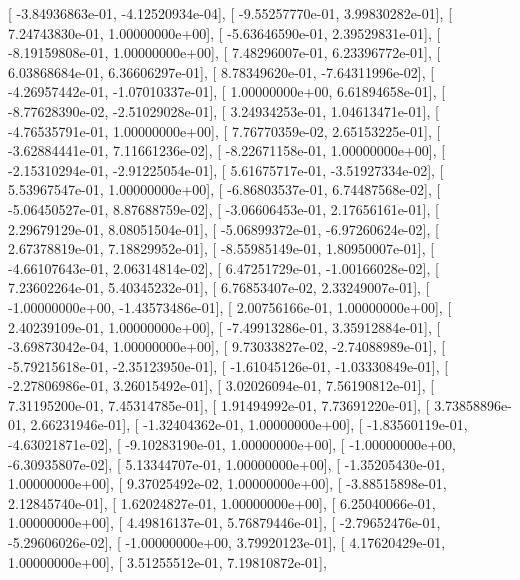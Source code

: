 \documentclass{article}
\begin{document}
       [ -3.84936863e-01,  -4.12520934e-04],
       [ -9.55257770e-01,   3.99830282e-01],
       [  7.24743830e-01,   1.00000000e+00],
       [ -5.63646590e-01,   2.39529831e-01],
       [ -8.19159808e-01,   1.00000000e+00],
       [  7.48296007e-01,   6.23396772e-01],
       [  6.03868684e-01,   6.36606297e-01],
       [  8.78349620e-01,  -7.64311996e-02],
       [ -4.26957442e-01,  -1.07010337e-01],
       [  1.00000000e+00,   6.61894658e-01],
       [ -8.77628390e-02,  -2.51029028e-01],
       [  3.24934253e-01,   1.04613471e-01],
       [ -4.76535791e-01,   1.00000000e+00],
       [  7.76770359e-02,   2.65153225e-01],
       [ -3.62884441e-01,   7.11661236e-02],
       [ -8.22671158e-01,   1.00000000e+00],
       [ -2.15310294e-01,  -2.91225054e-01],
       [  5.61675717e-01,  -3.51927334e-02],
       [  5.53967547e-01,   1.00000000e+00],
       [ -6.86803537e-01,   6.74487568e-02],
       [ -5.06450527e-01,   8.87688759e-02],
       [ -3.06606453e-01,   2.17656161e-01],
       [  2.29679129e-01,   8.08051504e-01],
       [ -5.06899372e-01,  -6.97260624e-02],
       [  2.67378819e-01,   7.18829952e-01],
       [ -8.55985149e-01,   1.80950007e-01],
       [ -4.66107643e-01,   2.06314814e-02],
       [  6.47251729e-01,  -1.00166028e-02],
       [  7.23602264e-01,   5.40345232e-01],
       [  6.76853407e-02,   2.33249007e-01],
       [ -1.00000000e+00,  -1.43573486e-01],
       [  2.00756166e-01,   1.00000000e+00],
       [  2.40239109e-01,   1.00000000e+00],
       [ -7.49913286e-01,   3.35912884e-01],
       [ -3.69873042e-04,   1.00000000e+00],
       [  9.73033827e-02,  -2.74088989e-01],
       [ -5.79215618e-01,  -2.35123950e-01],
       [ -1.61045126e-01,  -1.03330849e-01],
       [ -2.27806986e-01,   3.26015492e-01],
       [  3.02026094e-01,   7.56190812e-01],
       [  7.31195200e-01,   7.45314785e-01],
       [  1.91494992e-01,   7.73691220e-01],
       [  3.73858896e-01,   2.66231946e-01],
       [ -1.32404362e-01,   1.00000000e+00],
       [ -1.83560119e-01,  -4.63021871e-02],
       [ -9.10283190e-01,   1.00000000e+00],
       [ -1.00000000e+00,  -6.30935807e-02],
       [  5.13344707e-01,   1.00000000e+00],
       [ -1.35205430e-01,   1.00000000e+00],
       [  9.37025492e-02,   1.00000000e+00],
       [ -3.88515898e-01,   2.12845740e-01],
       [  1.62024827e-01,   1.00000000e+00],
       [  6.25040066e-01,   1.00000000e+00],
       [  4.49816137e-01,   5.76879446e-01],
       [ -2.79652476e-01,  -5.29606026e-02],
       [ -1.00000000e+00,   3.79920123e-01],
       [  4.17620429e-01,   1.00000000e+00],
       [  3.51255512e-01,   7.19810872e-01],
\end{document}
